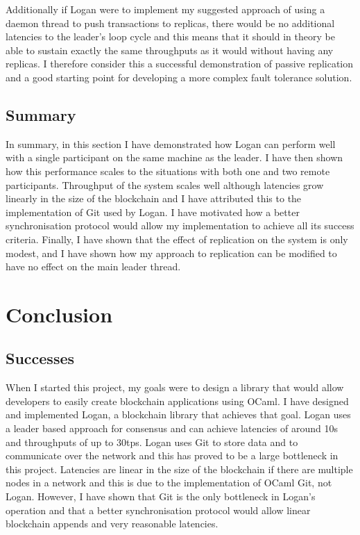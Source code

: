 \documentclass[12pt,a4paper,twoside,openright]{report}
\begin{document}
	Additionally if Logan were to implement my suggested approach of using a daemon thread to push transactions to replicas, there would be no additional latencies to the leader's loop cycle and this means that it should in theory be able to sustain exactly the same throughputs as it would without having any replicas.
	I therefore consider this a successful demonstration of passive replication and a good starting point for developing a more complex fault tolerance solution.

	\section{Summary}
	In summary, in this section I have demonstrated how Logan can perform well with a single participant on the same machine as the leader. 
	I have then shown how this performance scales to the situations with both one and two remote participants. 
	Throughput of the system scales well although latencies grow linearly in the size of the blockchain and I have attributed this to the implementation of Git used by Logan.
	I have motivated how a better synchronisation protocol would allow my implementation to achieve all its success criteria. 
	Finally, I have shown that the effect of replication on the system is only modest, and I have shown how my approach to replication can be modified to have no effect on the main leader thread.

	\chapter{Conclusion}
	\section{Successes}
	When I started this project, my goals were to design a library that would allow developers to easily create blockchain applications using OCaml.
	I have designed and implemented Logan, a blockchain library that achieves that goal.
	Logan uses a leader based approach for consensus and can achieve latencies of around 10s and throughputs of up to 30tps.
	Logan uses Git to store data and to communicate over the network and this has proved to be a large bottleneck in this project. 
	Latencies are linear in the size of the blockchain if there are multiple nodes in a network and this is due to the implementation of OCaml Git, not Logan.
	However, I have shown that Git is the only bottleneck in Logan's operation and that a better synchronisation protocol would allow linear blockchain appends and very reasonable latencies. 
\end{document}
